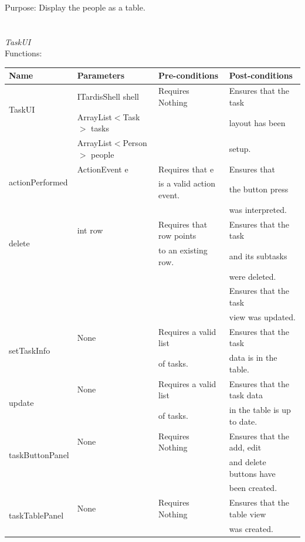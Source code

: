 Purpose: Display the people as a table.\\
\\
\\
\emph{TaskUI}\\
Functions:\\
\begin{tabular}{| l | l | l | l |}
\hline
Name & Parameters & Pre-conditions & Post-conditions\\
\hline
\multirow{2}{*}{TaskUI}{} & ITardisShell shell & Requires Nothing & Ensures that the task\\ 
			        & ArrayList$<$Task$>$ tasks & & layout has been\\ 
                                            & ArrayList$<$Person$>$ people & & setup.
\\
\hline
\multirow{2}{*}{actionPerformed} & ActionEvent e & Requires that e            & Ensures that\\
                                                        &                        & is a valid action event. & the button press\\
                                                        &                        &                                      & was interpreted.
\\
\hline
\multirow{2}{*}{delete} & int row         & Requires that row points & Ensures that the task \\
		 	    &                     & to an existing row.          & and its subtasks\\
		 	    &                     &                                         & were deleted.\\
 			    &                     &                                         & Ensures that the task\\
                                        &                     &                                         & view was updated.
\\
\hline
\multirow{2}{*}{setTaskInfo} & None & Requires a valid list & Ensures that the task \\
		 		&          & of tasks.                   & data is in the table. 
\\
\hline
\multirow{2}{*}{update} & None & Requires a valid list & Ensures that the task data\\
		 	     &          & of tasks.                  & in the table is up to date.
\\
\hline
\multirow{2}{*}{taskButtonPanel} & None & Requires Nothing & Ensures that the add, edit\\
		 	                    &          &                             & and delete buttons have\\
                                                        &          &                             & been created.
\\
\hline
\multirow{2}{*}{taskTablePanel} & None & Requires Nothing & Ensures that the table view\\
		 	                 &           &                             & was created.
\\
\hline
\end{tabular}

